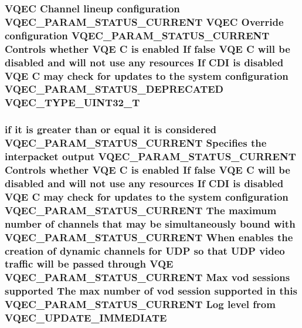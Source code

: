 \subsubsection{\setlength{\rightskip}{0pt plus 5cm}VQEC Channel lineup configuration VQEC\_\-PARAM\_\-STATUS\_\-CURRENT VQEC Override configuration VQEC\_\-PARAM\_\-STATUS\_\-CURRENT Controls whether VQE \bf{C} is enabled If false VQE \bf{C} will be disabled and will not use any resources If CDI is disabled VQE \bf{C} may check for updates \bf{to} the system configuration VQEC\_\-PARAM\_\-STATUS\_\-DEPRECATED \bf{VQEC\_\-TYPE\_\-UINT32\_\-T}}\label{vqec__cfg__settings_8h_be83b6d7d0e339c6e17cd2e0309d4cef}


\subsubsection{\setlength{\rightskip}{0pt plus 5cm}if it is greater than or equal it is considered VQEC\_\-PARAM\_\-STATUS\_\-CURRENT Specifies the interpacket output VQEC\_\-PARAM\_\-STATUS\_\-CURRENT Controls whether VQE \bf{C} is enabled If false VQE \bf{C} will be disabled and will not use any resources If CDI is disabled VQE \bf{C} may check for updates \bf{to} the system configuration VQEC\_\-PARAM\_\-STATUS\_\-CURRENT The maximum number of \bf{channels} that may be simultaneously bound with VQEC\_\-PARAM\_\-STATUS\_\-CURRENT When enables the creation of dynamic \bf{channels} for UDP so that UDP video traffic will be passed through VQE VQEC\_\-PARAM\_\-STATUS\_\-CURRENT Max vod sessions supported The max number of vod session supported in \bf{this} VQEC\_\-PARAM\_\-STATUS\_\-CURRENT Log level from \bf{VQEC\_\-UPDATE\_\-IMMEDIATE}}\label{vqec__cfg__settings_8h_3267d98d1b1a3361f63ff1dcc7a10c18}


